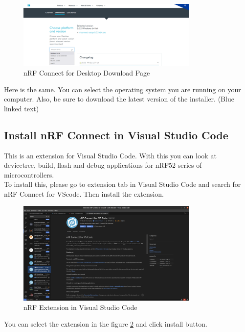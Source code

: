 \documentclass[11pt]{article}
\begin{document}
\begin{figure}[H]
    \centering
    \includegraphics[width=0.8\textwidth]{sdk.png}
    \caption{nRF Connect for Desktop Download Page}
    \label{fig:command_line_tools}
    \end{figure}
Here is the same. You can select the operating system you are running on your computer. Also, be sure to download the latest version of the installer. (Blue linked text) \\

\subsection{Install nRF Connect in Visual Studio Code}
This is an extension for Visual Studio Code. With this you can look at devicetree, build, flash and debug applications for nRF52 series of microcontrollers. \\
To install this, please go to extension tab in Visual Studio Code and search for nRF Connect for VScode. Then install the extension. \\

\begin{figure}[H]
    \centering
    \includegraphics[width=0.8\textwidth]{github.png}
    \caption{nRF Extension in Visual Studio Code}
    \label{fig: Extension in Visual Studio Code}
    \end{figure}

You can select the extension in the figure \ref{fig: Extension in Visual Studio Code} and click install button. \\   
\end{document}
